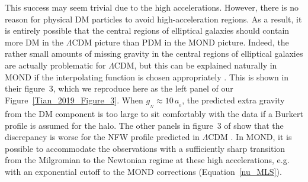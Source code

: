 \documentclass[fleqn,usenatbib,useAMS]{mnras} %
\begin{document}
This success may seem trivial due to the high accelerations. However, there is no reason for physical DM particles to avoid high-acceleration regions. As a result, it is entirely possible that the central regions of elliptical galaxies should contain more DM in the $\Lambda$CDM picture than PDM in the MOND picture. Indeed, the rather small amounts of missing gravity in the central regions of elliptical galaxies are actually problematic for $\Lambda$CDM, but this can be explained naturally in MOND if the interpolating function is chosen appropriately \citep{Tian_2019}. This is shown in their figure~3, which we reproduce here as the left panel of our Figure~\ref{Tian_2019_Figure_3}. When $g_{_N} \approx 10 \, a_{_0}$, the predicted extra gravity from the DM component is too large to sit comfortably with the data if a Burkert profile is assumed for the halo. The other panels in figure~3 of \citet{Tian_2019} show that the discrepancy is worse for the NFW profile predicted in $\Lambda$CDM \citep{Navarro_1997}. In MOND, it is possible to accommodate the observations with a sufficiently sharp transition from the Milgromian to the Newtonian regime at these high accelerations, e.g. with an exponential cutoff to the MOND corrections (Equation~\ref{nu_MLS}).
\end{document}
